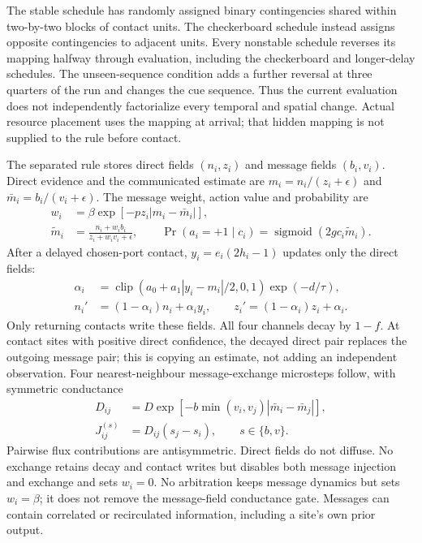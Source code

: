 The stable schedule has randomly assigned binary contingencies shared within two-by-two blocks of contact units. The checkerboard schedule instead assigns opposite contingencies to adjacent units. Every nonstable schedule reverses its mapping halfway through evaluation, including the checkerboard and longer-delay schedules. The unseen-sequence condition adds a further reversal at three quarters of the run and changes the cue sequence. Thus the current evaluation does not independently factorialize every temporal and spatial change. Actual resource placement uses the mapping at arrival; that hidden mapping is not supplied to the rule before contact.

The separated rule stores direct fields $(n_i,z_i)$ and message fields $(b_i,v_i)$. Direct evidence and the communicated estimate are $m_i=n_i/(z_i+\epsilon)$ and $\bar m_i=b_i/(v_i+\epsilon)$. The message weight, action value and probability are
\begin{align}
w_i&=\beta\exp[-p z_i|m_i-\bar m_i|],\\
\widetilde m_i&=\frac{n_i+w_i b_i}{z_i+w_i v_i+\epsilon},\qquad
\Pr(a_i=+1\mid c_i)=\operatorname{sigmoid}(2g c_i\widetilde m_i).
\end{align}
After a delayed chosen-port contact, $y_i=e_i(2h_i-1)$ updates only the direct fields:
\begin{align}
\alpha_i&=\operatorname{clip}\!\left(a_0+a_1|y_i-m_i|/2,0,1\right)\exp(-d/\tau),\\
n_i'&=(1-\alpha_i)n_i+\alpha_i y_i,\qquad
z_i'=(1-\alpha_i)z_i+\alpha_i.
\end{align}
Only returning contacts write these fields. All four channels decay by $1-f$. At contact sites with positive direct confidence, the decayed direct pair replaces the outgoing message pair; this is copying an estimate, not adding an independent observation. Four nearest-neighbour message-exchange microsteps follow, with symmetric conductance
\begin{align}
D_{ij}&=D\exp[-b\min(v_i,v_j)|\bar m_i-\bar m_j|],\\
J_{ij}^{(s)}&=D_{ij}(s_j-s_i),\qquad s\in\{b,v\}.
\end{align}
Pairwise flux contributions are antisymmetric. Direct fields do not diffuse. No exchange retains decay and contact writes but disables both message injection and exchange and sets $w_i=0$. No arbitration keeps message dynamics but sets $w_i=\beta$; it does not remove the message-field conductance gate. Messages can contain correlated or recirculated information, including a site's own prior output.

